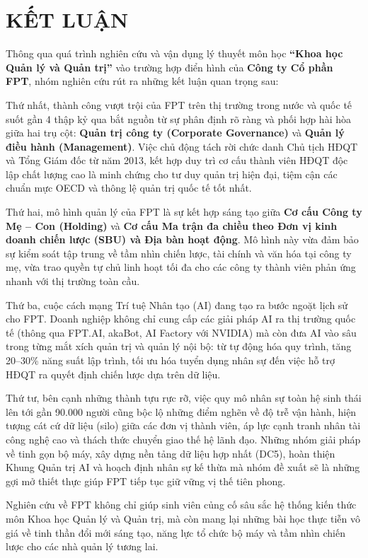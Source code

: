 \section*{KẾT LUẬN}

Thông qua quá trình nghiên cứu và vận dụng lý thuyết môn học \textbf{``Khoa học Quản lý và Quản trị''} vào trường hợp điển hình của \textbf{Công ty Cổ phần FPT}, nhóm nghiên cứu rút ra những kết luận quan trọng sau:

Thứ nhất, thành công vượt trội của FPT trên thị trường trong nước và quốc tế suốt gần 4 thập kỷ qua bắt nguồn từ sự phân định rõ ràng và phối hợp hài hòa giữa hai trụ cột: \textbf{Quản trị công ty (Corporate Governance)} và \textbf{Quản lý điều hành (Management)}. Việc chủ động tách rời chức danh Chủ tịch HĐQT và Tổng Giám đốc từ năm 2013, kết hợp duy trì cơ cấu thành viên HĐQT độc lập chất lượng cao là minh chứng cho tư duy quản trị hiện đại, tiệm cận các chuẩn mực OECD và thông lệ quản trị quốc tế tốt nhất.

Thứ hai, mô hình quản lý của FPT là sự kết hợp sáng tạo giữa \textbf{Cơ cấu Công ty Mẹ -- Con (Holding)} và \textbf{Cơ cấu Ma trận đa chiều theo Đơn vị kinh doanh chiến lược (SBU) và Địa bàn hoạt động}. Mô hình này vừa đảm bảo sự kiểm soát tập trung về tầm nhìn chiến lược, tài chính và văn hóa tại công ty mẹ, vừa trao quyền tự chủ linh hoạt tối đa cho các công ty thành viên phản ứng nhanh với thị trường toàn cầu.

Thứ ba, cuộc cách mạng Trí tuệ Nhân tạo (AI) đang tạo ra bước ngoặt lịch sử cho FPT. Doanh nghiệp không chỉ cung cấp các giải pháp AI ra thị trường quốc tế (thông qua FPT.AI, akaBot, AI Factory với NVIDIA) mà còn đưa AI vào sâu trong từng mắt xích quản trị và quản lý nội bộ: từ tự động hóa quy trình, tăng 20--30\% năng suất lập trình, tối ưu hóa tuyển dụng nhân sự đến việc hỗ trợ HĐQT ra quyết định chiến lược dựa trên dữ liệu.

Thứ tư, bên cạnh những thành tựu rực rỡ, việc quy mô nhân sự toàn hệ sinh thái lên tới gần 90.000 người cũng bộc lộ những điểm nghẽn về độ trễ vận hành, hiện tượng cát cứ dữ liệu (silo) giữa các đơn vị thành viên, áp lực cạnh tranh nhân tài công nghệ cao và thách thức chuyển giao thế hệ lãnh đạo. Những nhóm giải pháp về tinh gọn bộ máy, xây dựng nền tảng dữ liệu hợp nhất (DC5), hoàn thiện Khung Quản trị AI và hoạch định nhân sự kế thừa mà nhóm đề xuất sẽ là những gợi mở thiết thực giúp FPT tiếp tục giữ vững vị thế tiên phong.

Nghiên cứu về FPT không chỉ giúp sinh viên củng cố sâu sắc hệ thống kiến thức môn Khoa học Quản lý và Quản trị, mà còn mang lại những bài học thực tiễn vô giá về tinh thần đổi mới sáng tạo, năng lực tổ chức bộ máy và tầm nhìn chiến lược cho các nhà quản lý tương lai.
